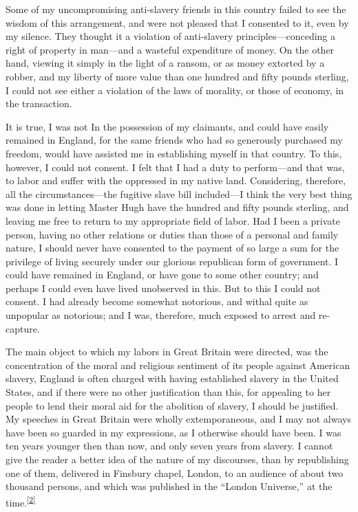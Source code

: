 Some of my uncompromising anti-slavery friends in this country failed to
see the wisdom of this arrangement, and were not pleased that I
consented to it, even by my silence. They thought it a violation of
anti-slavery principles---conceding a right of property in man---and a
wasteful expenditure of money. On the other hand, viewing it simply in
the light of a ransom, or as money extorted by a robber, and my liberty
of more value than one hundred and fifty pounds sterling, I could not
see either a violation of the laws of morality, or those of economy, in
the transaction.

{\protect\hypertarget{376}{}{}}It is true, I was not In the possession
of my claimants, and could have easily remained in England, for the same
friends who had so generously purchased my freedom, would have assisted
me in establishing myself in that country. To this, however, I could not
consent. I felt that I had a duty to perform---and that was, to labor
and suffer with the oppressed in my native land. Considering, therefore,
all the circumstances---the fugitive slave bill included---I think the
very best thing was done in letting Master Hugh have the hundred and
fifty pounds sterling, and leaving me free to return to my appropriate
field of labor. Had I been a private person, having no other relations
or duties than those of a personal and family nature, I should never
have consented to the payment of so large a sum for the privilege of
living securely under our glorious republican form of government. I
could have remained in England, or have gone to some other country; and
perhaps I could even have lived unobserved in this. But to this I could
not consent. I had already become somewhat notorious, and withal quite
as unpopular as notorious; and I was, therefore, much exposed to arrest
and re-capture.

The main object to which my labors in Great Britain were directed, was
the concentration of the moral and religious sentiment of its people
against American slavery, England is often charged with having
{\protect\hypertarget{377}{}{}}established slavery in the United States,
and if there were no other justification than this, for appealing to her
people to lend their moral aid for the abolition of slavery, I should be
justified. My speeches in Great Britain were wholly extemporaneous, and
I may not always have been so guarded in my expressions, as I otherwise
should have been. I was ten years younger then than now, and only seven
years from slavery. I cannot give the reader a better idea of the nature
of my discourses, than by republishing one of them, delivered in
Finsbury chapel, London, to an audience of about two thousand persons,
and which was published in the ``London Universe,'' at the
time.\textsuperscript{\protect\hyperlink{cite_note-2}{{[}2{]}}}

